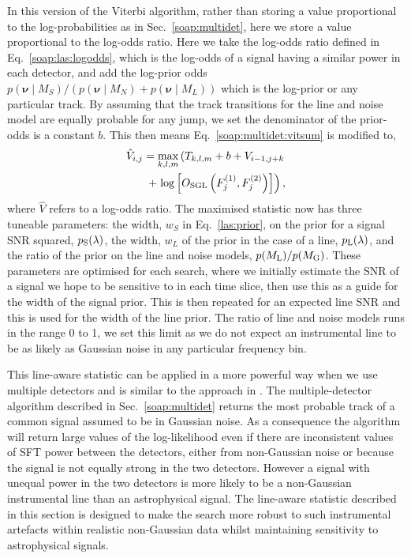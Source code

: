 In this version of the Viterbi algorithm, rather than storing a value proportional to the log-probabilities as in Sec.~\ref{soap:multidet}, here we store a value proportional to the log-odds ratio.
Here we take the log-odds ratio defined in Eq.~\ref{soap:las:logodds}, which is the log-odds of a signal having a similar power in each detector, and add the log-prior odds $p(\bm{\nu} \mid M_S)/(p(\bm{\nu} \mid M_N) + p(\bm{\nu} \mid M_L))$ which is the log-prior or any particular track. By assuming that the track transitions for the line and noise model are equally probable for any jump, we set the denominator of the prior-odds is a constant $b$.
This then means Eq.~\ref{soap:multidet:vitsum} is modified to,
\begin{equation}
\begin{split}
\label{lineaware:stat}
\hat{V}_{i,j} = \max_{k,l,m}\left(T_{k,l,m} + b + V_{i-1,j+k}   \right. \\
 + \left.  \log\left[O_{\rm{SGL}}\left(F^{(1)}_{j},F^{(2)}_{j}\right)\right]\right),
\end{split}
\end{equation}
%
where $\hat{V}$ refers to a log-odds ratio.
The maximised statistic now has three tuneable parameters: the width, $w_S$ in Eq.~\ref{las:prior}, on the prior for a signal \gls{SNR} squared, $p_{\rm S}(\lambda)$, the width, $w_L$ of the prior in the case of a line, $p_{\rm L}(\lambda)$, and the ratio of the prior on the line and noise models, $p({M_{\rm L}})/p({M_{\rm G}})$.  These parameters are optimised for each search, where we initially estimate the \gls{SNR} of a signal we hope to be sensitive to in each time slice, then use this as a guide for the width of the signal prior. This is then repeated for an expected line \gls{SNR} and this is used for the width of the line prior. The ratio of line and noise models runs in the range 0 to 1, we set this limit as we do not expect an instrumental line to be as likely as Gaussian noise in any particular frequency bin.

%
%
This line-aware statistic can be applied in a more powerful way when we use multiple detectors and is similar to the approach in \citep{keitel2014SearchContinuousa}. The multiple-detector algorithm described in Sec.~\ref{soap:multidet} returns the most probable track of a common signal assumed to be in Gaussian noise. As a consequence the algorithm will return large values of the log-likelihood even if there are inconsistent values of \gls{SFT} power between the detectors, either from non-Gaussian noise or because the signal is not equally strong in the two detectors. However a signal with unequal power in the two detectors is more likely to be a non-Gaussian instrumental line than an astrophysical signal. The line-aware statistic described in this section is designed to make the search more robust to such instrumental artefacts within realistic non-Gaussian data whilst maintaining sensitivity to astrophysical signals.


